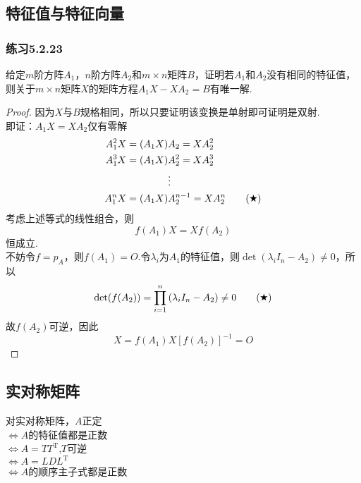 \documentclass[11pt,a4paper,oneside,fontset=windows]{ctexbook}
\begin{document}
\subsection{特征值与特征向量}
\subsubsection{练习5.2.23}
给定$m$阶方阵$A_1$，$n$阶方阵$A_2$和$m\times n$矩阵$B$，证明若$A_1$和$A_2$没有相同的特征值，则关于$m\times n$矩阵$X$的矩阵方程$A_1X-XA_2=B$有唯一解.\\
\begin{proof}
  因为$X$与$B$规格相同，所以只要证明该变换是单射即可证明是双射.\\
  即证：$A_1X=XA_2$仅有零解
  \begin{align*}
    A_1^2X=(A_1X) & A_2=XA_2^2                      \\
    A_1^3X=(A_1X) & A_2^2=XA_2^3                    \\
                  & \vdots                          \\
    A_1^nX=(A_1X) & A_2^{n-1}=XA_2^n\tag{\ding{72}}
  \end{align*}
  考虑上述等式的线性组合，则
  $$f(A_1)X=Xf(A_2)$$
  恒成立.\\
  不妨令$f=p_A$，则$f(A_1)=O$.令$\lambda_i$为$A_1$的特征值，则$\det(\lambda_iI_n-A_2)\neq 0$，所以
  \begin{align*}
    \det(f(A_2))=\prod\limits_{i=1}^{n}{(\lambda_i I_n-A_2)}\neq 0 \tag{\ding{72}}
  \end{align*}
  故$f(A_2)$可逆，因此$$X=f(A_1)X\left[f(A_2)\right]^{-1}=O$$
\end{proof}
\subsection{实对称矩阵}
对实对称矩阵，$A$正定\\$\iff$$A$的特征值都是正数\\$\iff$$A=TT^{\mathrm{T}}$,$T$可逆\\$\iff$$A=LDL^{\mathrm{T}}$\\$\iff$$A$的顺序主子式都是正数
\end{document}
